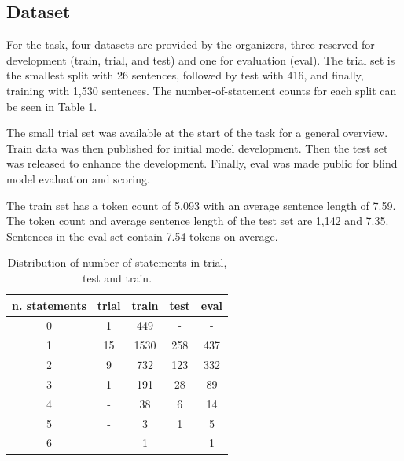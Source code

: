 \documentclass[11pt]{article}
\begin{document}
\subsection{Dataset}\label{subsec: dataset}


For the task, four datasets are provided by the organizers, three reserved for development (train, trial, and test) and one for evaluation (eval). The trial set is the smallest split with 26 sentences, followed by test with 416, and finally, training with 1,530 sentences. The number-of-statement counts for each split can be seen in Table \ref{tab:num-statements}.


The small trial set was available at the start of the task for a general overview. Train data was then published for initial model development. Then the test set was released to enhance the development. Finally, eval was made public for blind model evaluation and scoring.

The train set has a token count of 5,093 with an average sentence length of 7.59. The token count and average sentence length of the test set are 1,142 and 7.35. Sentences in the eval set contain 7.54 tokens on average. %

\begin{table}[ht]
\begin{tabular}{ccccc}
\hline
 n. statements &
 trial  & train  & test & eval\\
\hline
0 & 1 & 449 & - & -\\
1 & 15 & 1530 & 258 & 437 \\
2 & 9 & 732 & 123 & 332\\
3 & 1 & 191 & 28 & 89\\
4 & - & 38 & 6 & 14\\
5 & - & 3 & 1 & 5\\
6 & - & 1 & - & 1\\
\hline
\end{tabular}\centering\caption{Distribution of number of statements in trial, test and train.}\label{tab:num-statements}
\end{table}
\end{document}
